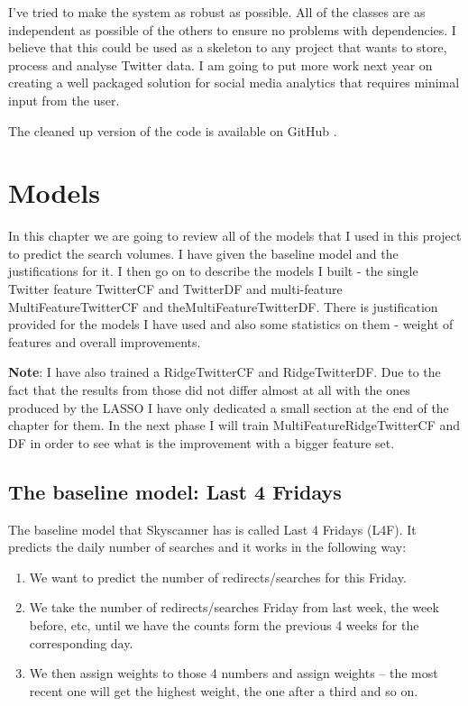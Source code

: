 \documentclass[minf,twoside,singlespacing,parskip,frontabs,notimes,11pt]{infthesis}
\begin{document}
I've tried to make the system as robust as possible. All of the classes are as independent as possible of the others to ensure no problems with dependencies. I believe that this could be used as a skeleton to any project that wants to store, process and analyse Twitter data. I am going to put more work next year on creating a well packaged solution for social media analytics that requires minimal input from the user.

The cleaned up version of the code is available on GitHub \cite{code}.






\chapter{Models}
\label{chap:model}


In this chapter we are going to review all of the models that I used in this project to predict the search volumes. I have given the baseline model and the justifications for it. I then go on to describe the models I built - the single Twitter feature TwitterCF and TwitterDF and multi-feature MultiFeatureTwitterCF and theMultiFeatureTwitterDF. There is justification provided for the models I have used and also some statistics on them - weight of features and overall improvements. 


\textbf{Note}: I have also trained a RidgeTwitterCF and RidgeTwitterDF. Due to the fact that the results from those did not differ almost at all with the ones produced by the LASSO I have only dedicated a small section at the end of the chapter for them. In the next phase I will train MultiFeatureRidgeTwitterCF and DF in order to see what is the improvement with a bigger feature set.


\section{The baseline model: Last 4 Fridays}
\label{sec:baseline}

The baseline model that Skyscanner has is called Last 4 Fridays (L4F). 
It predicts the daily number of searches and it works in the following way:
\begin{enumerate}
\item We want to predict the number of redirects/searches for this Friday.
\item We take the number of redirects/searches Friday from last week, the week before, etc, until we have the counts form the previous 4 weeks for the corresponding day.
\item We then assign weights to those 4 numbers and assign weights -- the most recent one will get the highest weight, the one after a third and so on.
\end{enumerate}
\end{document}
